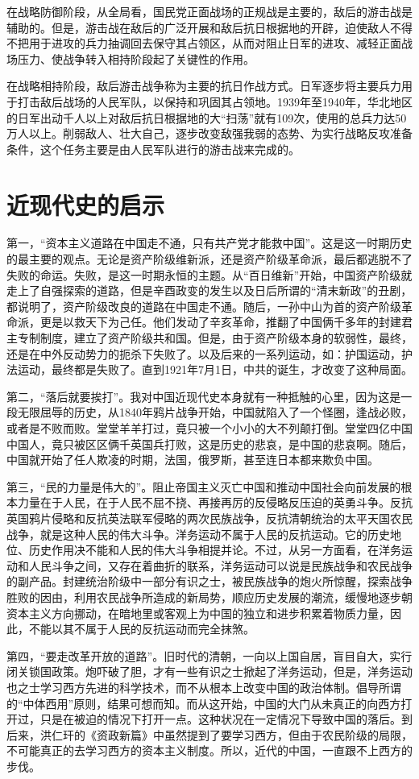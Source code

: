 \documentclass{article}
\begin{document}
\begin{CJK}{UTF8}{song}
在战略防御阶段，从全局看，国民党正面战场的正规战是主要的，敌后的游击战是辅助的。但是，游击战在敌后的广泛开展和敌后抗日根据地的开辟，迫使敌人不得不把用于进攻的兵力抽调回去保守其占领区，从而对阻止日军的进攻、减轻正面战场压力、使战争转入相持阶段起了关键性的作用。

在战略相持阶段，敌后游击战争称为主要的抗日作战方式。日军逐步将主要兵力用于打击敌后战场的人民军队，以保持和巩固其占领地。1939年至1940年，华北地区的日军出动千人以上对敌后抗日根据地的大“扫荡”就有109次，使用的总兵力达50万人以上。削弱敌人、壮大自己，逐步改变敌强我弱的态势、为实行战略反攻准备条件，这个任务主要是由人民军队进行的游击战来完成的。

\section{近现代史的启示}

第一，“资本主义道路在中国走不通，只有共产党才能救中国”。这是这一时期历史的最主要的观点。无论是资产阶级维新派，还是资产阶级革命派，最后都逃脱不了失败的命运。失败，是这一时期永恒的主题。从“百日维新”开始，中国资产阶级就走上了自强探索的道路，但是辛酉政变的发生以及日后所谓的“清末新政”的丑剧，都说明了，资产阶级改良的道路在中国走不通。随后，一孙中山为首的资产阶级革命派，更是以救天下为己任。他们发动了辛亥革命，推翻了中国俩千多年的封建君主专制制度，建立了资产阶级共和国。但是，由于资产阶级本身的软弱性，最终，还是在中外反动势力的扼杀下失败了。以及后来的一系列运动，如：护国运动，护法运动，最终都是失败了。直到1921年7月1日，中共的诞生，才改变了这种局面。

第二，“落后就要挨打”。我对中国近现代史本身就有一种抵触的心里，因为这是一段无限屈辱的历史，从1840年鸦片战争开始，中国就陷入了一个怪圈，逢战必败，或者是不败而败。堂堂羊羊打过，竟只被一个小小的大不列颠打倒。堂堂四亿中国中国人，竟只被区区俩千英国兵打败，这是历史的悲哀，是中国的悲哀啊。随后，中国就开始了任人欺凌的时期，法国，俄罗斯，甚至连日本都来欺负中国。

第三，“民的力量是伟大的”。阻止帝国主义灭亡中国和推动中国社会向前发展的根本力量在于人民，在于人民不屈不挠、再接再厉的反侵略反压迫的英勇斗争。反抗英国鸦片侵略和反抗英法联军侵略的两次民族战争，反抗清朝统治的太平天国农民战争，就是这种人民的伟大斗争。洋务运动不属于人民的反抗运动。它的历史地位、历史作用决不能和人民的伟大斗争相提并论。不过，从另一方面看，在洋务运动和人民斗争之间，又存在着曲折的联系，洋务运动可以说是民族战争和农民战争的副产品。封建统治阶级中一部分有识之士，被民族战争的炮火所惊醒，探索战争胜败的因由，利用农民战争所造成的新局势，顺应历史发展的潮流，缓慢地逐步朝资本主义方向挪动，在暗地里或客观上为中国的独立和进步积累着物质力量，因此，不能以其不属于人民的反抗运动而完全抹煞。

第四，“要走改革开放的道路”。旧时代的清朝，一向以上国自居，盲目自大，实行闭关锁国政策。炮吓破了胆，才有一些有识之士掀起了洋务运动，但是，洋务运动也之士学习西方先进的科学技术，而不从根本上改变中国的政治体制。倡导所谓的“中体西用”原则，结果可想而知。而从这开始，中国的大门从未真正的向西方打开过，只是在被迫的情况下打开一点。这种状况在一定情况下导致中国的落后。到后来，洪仁玕的《资政新篇》中虽然提到了要学习西方，但由于农民阶级的局限，不可能真正的去学习西方的资本主义制度。所以，近代的中国，一直跟不上西方的步伐。

\end{CJK}
\end{document}
